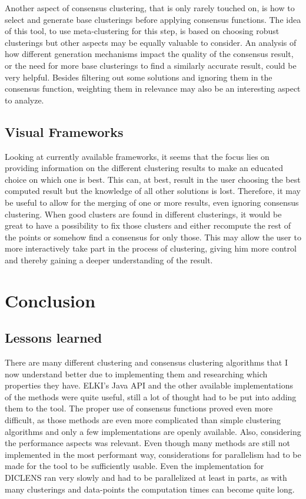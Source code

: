 \documentclass[
	a4paper,
	english,
	twoside,
	openright,               
	11pt                            
	]{report}
\begin{document}
Another aspect of consensus clustering, that is only rarely touched on, is how to select and generate base clusterings before applying consensus functions. The idea of this tool, to use meta-clustering for this step, is based on choosing robust clusterings but other aspects may be equally valuable to consider. An analysis of how different generation mechanisms impact the quality of the consensus result, or the need for more base clusterings to find a similarly accurate result, could be very helpful. Besides filtering out some solutions and ignoring them in the consensus function, weighting them in relevance may also be an interesting aspect to analyze.

\section{Visual Frameworks}
Looking at currently available frameworks, it seems that the focus lies on providing information on the different clustering results to make an educated choice on which one is best. This can, at best, result in the user choosing the best computed result but the knowledge of all other solutions is lost. Therefore, it may be useful to allow for the merging of one or more results, even ignoring consensus clustering. When good clusters are found in different clusterings, it would be great to have a possibility to fix those clusters and either recompute the rest of the points or somehow find a consensus for only those. This may allow the user to more interactively take part in the process of clustering, giving him more control and thereby gaining a deeper understanding of the result.

\chapter{Conclusion}\label{cha:conclusion}

\section{Lessons learned}
There are many different clustering and consensus clustering algorithms that I now understand better due to implementing them and researching which properties they have. ELKI's \cite{10.14778/2824032.2824115} Java API and the other available implementations of the methods were quite useful, still a lot of thought had to be put into adding them to the tool. The proper use of consensus functions proved even more difficult, as those methods are even more complicated than simple clustering algorithms and only a few implementations are openly available. Also, considering the performance aspects was relevant. Even though many methods are still not implemented in the most performant way, considerations for parallelism had to be made for the tool to be sufficiently usable. Even the implementation for DICLENS \cite{6035671} ran very slowly and had to be parallelized at least in parts, as with many clusterings and data-points the computation times can become quite long.
\end{document}
